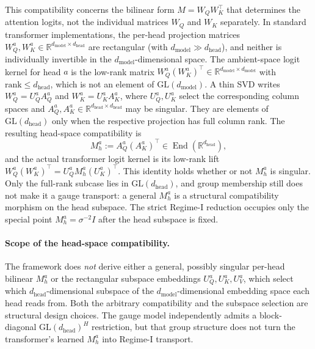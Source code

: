 \documentclass[twoside,11pt]{article}
\begin{document}
This compatibility concerns the bilinear form $M = W_QW_K^\top$ that determines the attention logits, not the individual matrices $W_Q$ and $W_K$ separately. In standard transformer implementations, the per-head projection matrices $W_Q^a, W_K^a \in \mathbb{R}^{d_{\text{model}} \times d_{\text{head}}}$ are rectangular (with $d_{\text{model}} \gg d_{\text{head}}$), and neither is individually invertible in the $d_{\text{model}}$-dimensional space. The ambient-space logit kernel for head $a$ is the low-rank matrix $W_Q^a (W_K^a)^\top \in \mathbb{R}^{d_{\text{model}} \times d_{\text{model}}}$ with $\mathrm{rank} \leq d_{\text{head}}$, which is not an element of $\mathrm{GL}(d_{\text{model}})$. A thin SVD writes $W_Q^a = U_Q^a A_Q^a$ and $W_K^a = U_K^a A_K^a$, where $U_Q^a, U_K^a$ select the corresponding column spaces and $A_Q^a, A_K^a \in \mathbb{R}^{d_{\text{head}}\times d_{\text{head}}}$ may be singular. They are elements of $\mathrm{GL}(d_{\text{head}})$ only when the respective projection has full column rank. The resulting head-space compatibility is
%
\begin{equation}
M_h^a := A_Q^a (A_K^a)^\top \in \operatorname{End}(\mathbb{R}^{d_{\text{head}}}),
\label{eq:head_space_kernel}
\end{equation}
%
and the actual transformer logit kernel is its low-rank lift $W_Q^a (W_K^a)^\top = U_Q^a M_h^a (U_K^a)^\top$. This identity holds whether or not $M_h^a$ is singular. Only the full-rank subcase lies in $\mathrm{GL}(d_{\text{head}})$, and group membership still does not make it a gauge transport: a general $M_h^a$ is a structural compatibility morphism on the head subspace. The strict Regime-I reduction occupies only the special point $M_h^a = \sigma^{-2}I$ after the head subspace is fixed.

\paragraph{Scope of the head-space compatibility.} The framework does \emph{not} derive either a general, possibly singular per-head bilinear $M_h^a$ or the rectangular subspace embeddings $U_Q^a, U_K^a, U_V^a$, which select which $d_{\text{head}}$-dimensional subspace of the $d_{\text{model}}$-dimensional embedding space each head reads from. Both the arbitrary compatibility and the subspace selection are structural design choices. The gauge model independently admits a block-diagonal $\mathrm{GL}(d_{\text{head}})^H$ restriction, but that group structure does not turn the transformer's learned $M_h^a$ into Regime-I transport.
\end{document}
